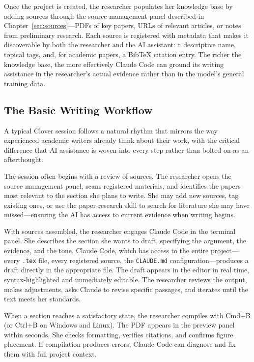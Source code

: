 \documentclass[a4paper,11pt]{article}
\begin{document}
Once the project is created, the researcher populates her knowledge base by adding sources through the source management panel described in Chapter~\ref{sec:sources}---PDFs of key papers, URLs of relevant articles, or notes from preliminary research. Each source is registered with metadata that makes it discoverable by both the researcher and the AI assistant: a descriptive name, topical tags, and, for academic papers, a BibTeX citation entry. The richer the knowledge base, the more effectively Claude Code can ground its writing assistance in the researcher's actual evidence rather than in the model's general training data.

\subsection{The Basic Writing Workflow}

A typical Clover session follows a natural rhythm that mirrors the way experienced academic writers already think about their work, with the critical difference that AI assistance is woven into every step rather than bolted on as an afterthought.

The session often begins with a review of sources. The researcher opens the source management panel, scans registered materials, and identifies the papers most relevant to the section she plans to write. She may add new sources, tag existing ones, or use the paper-research skill to search for literature she may have missed---ensuring the AI has access to current evidence when writing begins.

With sources assembled, the researcher engages Claude Code in the terminal panel. She describes the section she wants to draft, specifying the argument, the evidence, and the tone. Claude Code, which has access to the entire project---every \texttt{.tex} file, every registered source, the \texttt{CLAUDE.md} configuration---produces a draft directly in the appropriate file. The draft appears in the editor in real time, syntax-highlighted and immediately editable. The researcher reviews the output, makes adjustments, asks Claude to revise specific passages, and iterates until the text meets her standards.

When a section reaches a satisfactory state, the researcher compiles with Cmd+B (or Ctrl+B on Windows and Linux). The PDF appears in the preview panel within seconds. She checks formatting, verifies citations, and confirms figure placement. If compilation produces errors, Claude Code can diagnose and fix them with full project context.
\end{document}
